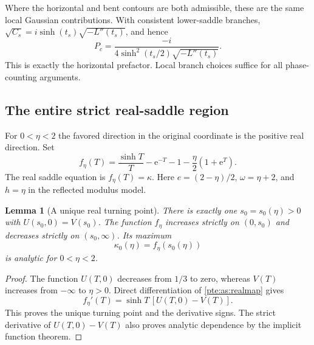 \documentclass[11pt,a4paper]{article}
\numberwithin{equation}{section}
\newtheorem{lemma}[theorem]{Lemma}
\theoremstyle{definition}
\theoremstyle{plain}
\newcommand{\ee}{\mathrm e}
\begin{document}
Where the horizontal and bent contours are both admissible, these
are the same local Gaussian contributions.  With consistent lower-saddle
branches, $\sqrt{C_s}=i\sinh(t_s)\sqrt{-L''(t_s)}$, and hence
\[
 P_c=\frac{-i}{4\sinh^2(t_s/2)\sqrt{-L''(t_s)}}.
\]
This is exactly the horizontal prefactor.  Local branch choices suffice
for all phase-counting arguments.

\subsection{The entire strict real-saddle region}
\label{pte:as:realsection}
For $0<\eta<2$ the favored direction in the original coordinate is the
positive real direction.  Set
\begin{equation}\label{pte:as:realmap}
 f_\eta(T)=\frac{\sinh T}{T}-\ee^{-T}-1
                    -\frac\eta2(1+\ee^T).
\end{equation}
The real saddle equation is $f_\eta(T)=\kappa$.  Here
$e=(2-\eta)/2$, $\omega=\eta+2$, and $h=\eta$ in the reflected modulus model.

\begin{lemma}[A unique real turning point]\label{pte:as:realturning}
There is exactly one $s_0=s_0(\eta)>0$ with
$U(s_0,0)=V(s_0)$.  The function $f_\eta$ increases strictly on
$(0,s_0)$ and decreases strictly on $(s_0,\infty)$.  Its maximum
\begin{equation}\label{pte:as:realmaximum}
 \kappa_0(\eta)=f_\eta(s_0(\eta))
\end{equation}
is analytic for $0<\eta<2$.
\end{lemma}
\begin{proof}
The function $U(T,0)$ decreases from $1/3$ to zero, whereas $V(T)$
increases from $-\infty$ to $\eta>0$.  Direct differentiation of
\eqref{pte:as:realmap} gives
\begin{equation}\label{pte:as:realderivative}
 f_\eta'(T)=\sinh T\,[U(T,0)-V(T)].
\end{equation}
This proves the unique turning point and the derivative signs.
The strict derivative of $U(T,0)-V(T)$ also proves analytic dependence
by the implicit function theorem.
\end{proof}
\end{document}
